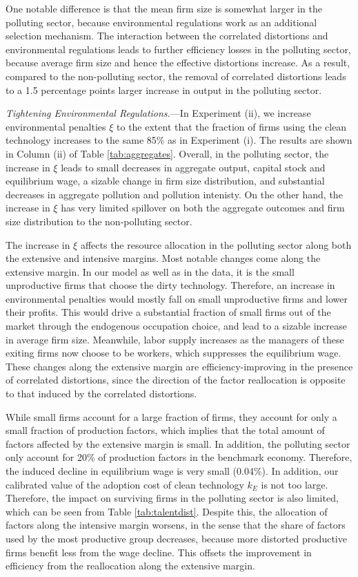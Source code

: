 \documentclass[AEJ]{AEA}
\begin{document}
One notable difference is that the mean firm size is somewhat larger in the polluting sector, because environmental regulations work as an additional selection mechanism. The interaction between the correlated distortions and environmental regulations leads to further efficiency losses in the polluting sector, because average firm size and hence the effective distortions increase. As a result, compared to the non-polluting sector, the removal of correlated distortions leads to a 1.5 percentage points larger increase in output in the polluting sector.

\textit{Tightening Environmental Regulations.}---In Experiment (ii), we increase environmental penalties $\xi$ to the extent that the fraction of firms using the clean technology increases to the same 85\% as in Experiment (i). The results are shown in Column (ii) of Table \ref{tab:aggregates}. Overall, in the polluting sector, the increase in $\xi$ leads to small decreases in aggregate output, capital stock and equilibrium wage, a sizable change in firm size distribution, and substantial decreases in aggregate pollution and pollution intenisty. On the other hand, the increase in $\xi$ has very limited spillover on both the aggregate outcomes and firm size distribution to the non-polluting sector.

The increase in $\xi$ affects the resource allocation in the polluting sector along both the extensive and intensive margins. Most notable changes come along the extensive margin. In our model as well as in the data, it is the small unproductive firms that choose the dirty technology. Therefore, an increase in environmental penalties would mostly fall on small unproductive firms and lower their profits. This would drive a substantial fraction of small firms out of the market through the endogenous occupation choice, and lead to a sizable increase in average firm size. Meanwhile, labor supply increases as the managers of these exiting firms now choose to be workers, which suppresses the equilibrium wage. These changes along the extensive margin are efficiency-improving in the presence of correlated distortions, since the direction of the factor reallocation is opposite to that induced by the correlated distortions.

While small firms account for a large fraction of firms, they account for only a small fraction of production factors, which implies that the total amount of factors affected by the extensive margin is small. In addition, the polluting sector only account for 20\% of production factors in the benchmark economy. Therefore, the induced decline in equilibrium wage is very small (0.04\%). In addition, our calibrated value of the adoption cost of clean technology $k_E$ is not too large. Therefore, the impact on surviving firms in the polluting sector is also limited, which can be seen from Table \ref{tab:talentdist}. Despite this, the allocation of factors along the intensive margin worsens, in the sense that the share of factors used by the most productive group decreases, because more distorted productive firms benefit less from the wage decline. This offsets the improvement in efficiency from the reallocation along the extensive margin.
\end{document}
